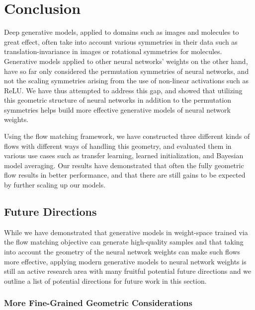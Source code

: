 
\chapter{Conclusion} \label{chapter:discussion}

Deep generative models, applied to domains such as images \citep{esserScalingRectifiedFlow2024b} and molecules \citep{abramsonAccurateStructurePrediction2024} to great effect, often take into account various symmetries in their data such as translation-invariance in images or rotational symmetries for molecules. Generative models applied to other neural networks' weights on the other hand, have so far only considered the permutation symmetries of neural networks, and not the scaling symmetries arising from the use of non-linear activations such as ReLU. We have thus attempted to address this gap, and showed that utilizing this geometric structure of neural networks in addition to the permutation symmetries helps build more effective generative models of neural network weights. 

Using the flow matching framework, we have constructed three different kinds of flows with different ways of handling this geometry, and evaluated them in various use cases such as transfer learning, learned initialization, and Bayesian model averaging. Our results have demonstrated that often the fully geometric flow results in better performance, and that there are still gains to be expected by further scaling up our models. 

\section{Future Directions}

While we have demonstrated that generative models in weight-space trained via the flow matching objective can generate high-quality samples and that taking into account the geometry of the neural network weights can make such flows more effective, applying modern generative models to neural network weights is still an active research area with many fruitful potential future directions and we outline a list of potential directions for future work in this section. 

\subsection{More Fine-Grained Geometric Considerations}

